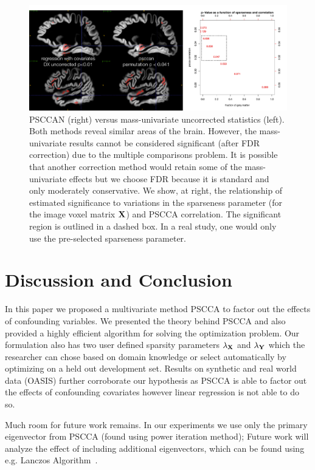 \documentclass{llncs}
\newcommand{\X}{{\bf X}}
\newcommand{\Y}{{\bf Y}}
\begin{document}
\begin{figure}
\label{fig:comp}
\begin{center}
\includegraphics[width=120mm]{MUvPSCCAN.pdf} 
\end{center}
\caption{PSCCAN (right) versus mass-univariate uncorrected statistics
(left).  Both methods reveal similar areas of the brain.  However, the
mass-univariate results cannot be considered significant (after FDR
correction) due to the multiple comparisons problem.  It is possible
that another correction method would retain some of the mass-univariate
effects but we choose FDR because it is standard and only moderately
conservative.  We show, at right, the relationship of estimated
significance to variations in the sparseness parameter (for the image
voxel matrix $\X$) and PSCCA correlation.  The significant region is
outlined in a dashed box.  In a real study, one would only use the
pre-selected sparseness parameter.}
\end{figure}


\section{Discussion and Conclusion}
In this paper we proposed a multivariate method PSCCA to factor out the effects of confounding variables.
We presented the theory behind PSCCA and also provided a highly efficient algorithm for solving the optimization problem. Our formulation also has two user defined sparsity parameters $\lambda_{\X}$ and $\lambda_{\Y}$ which the researcher can chose based on domain knowledge or select automatically by optimizing on a held out development set. Results on synthetic and real world data (OASIS) further corroborate our hypothesis as PSCCA is able to factor out the effects of confounding covariates however linear regression is not able to do so.

Much room for future work remains. In our experiments we use only the primary eigenvector from PSCCA (found using power iteration method); 
Future work will analyze the effect of including additional eigenvectors, which can be found using e.g. Lanczos Algorithm~\cite{golub}.
\end{document}

